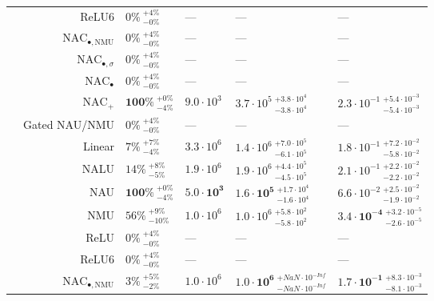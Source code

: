 \begin{longtable}{crllll}
\nopagebreak
\multirow{-11}{*}{\centering\arraybackslash $\bm{+}$} & ReLU6 & $0\% {~}^{+4\%}_{-0\%}$ & --- & --- & ---\\
\cmidrule{1-6}
 & $\mathrm{NAC}_{\bullet,\mathrm{NMU}}$ & $0\% {~}^{+4\%}_{-0\%}$ & --- & --- & ---\\

\nopagebreak
 & $\mathrm{NAC}_{\bullet,\sigma}$ & $0\% {~}^{+4\%}_{-0\%}$ & --- & --- & ---\\

\nopagebreak
 & $\mathrm{NAC}_{\bullet}$ & $0\% {~}^{+4\%}_{-0\%}$ & --- & --- & ---\\

\nopagebreak
 & $\mathrm{NAC}_{+}$ & $\mathbf{100\%} {~}^{+0\%}_{-4\%}$ & $9.0 \cdot 10^{3}$ & $3.7 \cdot 10^{5} {~}^{+3.8 \cdot 10^{4}}_{-3.8 \cdot 10^{4}}$ & $2.3 \cdot 10^{-1} {~}^{+5.4 \cdot 10^{-3}}_{-5.4 \cdot 10^{-3}}$\\

\nopagebreak
 & Gated NAU/NMU & $0\% {~}^{+4\%}_{-0\%}$ & --- & --- & ---\\

\nopagebreak
 & Linear & $7\% {~}^{+7\%}_{-4\%}$ & $3.3 \cdot 10^{6}$ & $1.4 \cdot 10^{6} {~}^{+7.0 \cdot 10^{5}}_{-6.1 \cdot 10^{5}}$ & $1.8 \cdot 10^{-1} {~}^{+7.2 \cdot 10^{-2}}_{-5.8 \cdot 10^{-2}}$\\

\nopagebreak
 & NALU & $14\% {~}^{+8\%}_{-5\%}$ & $1.9 \cdot 10^{6}$ & $1.9 \cdot 10^{6} {~}^{+4.4 \cdot 10^{5}}_{-4.5 \cdot 10^{5}}$ & $2.1 \cdot 10^{-1} {~}^{+2.2 \cdot 10^{-2}}_{-2.2 \cdot 10^{-2}}$\\

\nopagebreak
 & NAU & $\mathbf{100\%} {~}^{+0\%}_{-4\%}$ & $\mathbf{5.0 \cdot 10^{3}}$ & $\mathbf{1.6 \cdot 10^{5}} {~}^{+1.7 \cdot 10^{4}}_{-1.6 \cdot 10^{4}}$ & $6.6 \cdot 10^{-2} {~}^{+2.5 \cdot 10^{-2}}_{-1.9 \cdot 10^{-2}}$\\

\nopagebreak
 & NMU & $56\% {~}^{+9\%}_{-10\%}$ & $1.0 \cdot 10^{6}$ & $1.0 \cdot 10^{6} {~}^{+5.8 \cdot 10^{2}}_{-5.8 \cdot 10^{2}}$ & $\mathbf{3.4 \cdot 10^{-4}} {~}^{+3.2 \cdot 10^{-5}}_{-2.6 \cdot 10^{-5}}$\\

\nopagebreak
 & ReLU & $0\% {~}^{+4\%}_{-0\%}$ & --- & --- & ---\\

\nopagebreak
\multirow{-11}{*}{\centering\arraybackslash $\bm{-}$} & ReLU6 & $0\% {~}^{+4\%}_{-0\%}$ & --- & --- & ---\\
\cmidrule{1-6}
 & $\mathrm{NAC}_{\bullet,\mathrm{NMU}}$ & $3\% {~}^{+5\%}_{-2\%}$ & $1.0 \cdot 10^{6}$ & $\mathbf{1.0 \cdot 10^{6}} {~}^{+NaN \cdot 10^{-Inf}}_{-NaN \cdot 10^{-Inf}}$ & $\mathbf{1.7 \cdot 10^{-1}} {~}^{+8.3 \cdot 10^{-3}}_{-8.1 \cdot 10^{-3}}$\\


\end{longtable}
